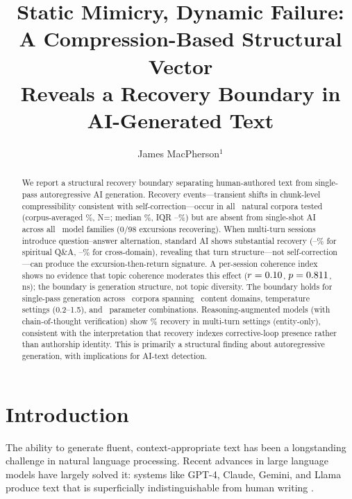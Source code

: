 \documentclass[final]{clv2025}
\title{Static Mimicry, Dynamic Failure: A Compression-Based Structural Vector\\ Reveals a Recovery Boundary in AI-Generated Text}
\author{James MacPherson$^{1}$}
\affil{Independent Researcher\\\quad \email{jamesmacpherson130@gmail.com}}
\begin{document}
\maketitle


\begin{abstract}
We report a structural recovery boundary separating human-authored text from single-pass autoregressive AI generation. Recovery events---transient shifts in chunk-level compressibility consistent with self-correction---occur in all \nNatural\ natural corpora tested (corpus-averaged \recNatCorpusAvg\%, N=\nNatural; median \recNatMedian\%, IQR \recNatIQRlo--\recNatIQRhi\%) but are absent from single-shot AI across all \nModels\ model families (0/98 excursions recovering). When multi-turn sessions introduce question--answer alternation, standard AI shows substantial recovery (\recClaudeMT--\recGPTMT\% for spiritual Q\&A, \recMTXdomMin--\recMTXdomMax\% for cross-domain), revealing that turn structure---not self-correction---can produce the excursion-then-return signature. A per-session coherence index shows no evidence that topic coherence moderates this effect ($r = 0.10$, $p = 0.811$, ns); the boundary is generation structure, not topic diversity. The boundary holds for single-pass generation across \nCorpora\ corpora spanning \nDomains\ content domains, temperature settings (0.2--1.5), and \nSensitivityCombos\ parameter combinations. Reasoning-augmented models (with chain-of-thought verification) show \recReasoningEntity\% recovery in multi-turn settings (entity-only), consistent with the interpretation that recovery indexes corrective-loop presence rather than authorship identity. This is primarily a structural finding about autoregressive generation, with implications for AI-text detection.
\end{abstract}


\section{Introduction}

The ability to generate fluent, context-appropriate text has been a longstanding challenge in natural language processing. Recent advances in large language models have largely solved it: systems like GPT-4, Claude, Gemini, and Llama produce text that is superficially indistinguishable from human writing \cite{tang2024survey,sadasivan2024aigenerated,mitchell2023detectgpt}.
\end{document}
